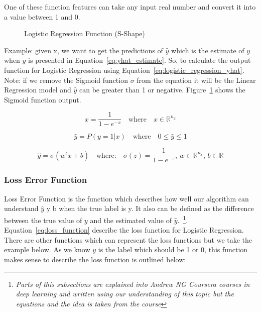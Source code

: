 One of these function features can take any input real number and convert it into a value between 1 and 0.

\begin{figure}
\centering

\caption{Logistic Regression Function (S-Shape)}\label{Fig:Logistic}
\end{figure}

Example: given x, we want to get the predictions of $\widehat{y}$ which is the estimate of $y$ when $\widehat{y}$ is presented in Equation~\eqref{eq:yhat_estimate}. So, to calculate the output function for Logistic Regression using Equation~\eqref{eq:logistic_regression_yhat}. Note: if we remove the Sigmoid function $\sigma$ from the equation it will be the Linear Regression model and $\widehat{y}$ can be greater than 1 or negative. Figure~\ref{Fig:Logistic} shows the Sigmoid function output. 

\begin{equation}\label{eq:logistic_function}
 x = \frac{1}{1-e^{-x}} \quad \text{where} \quad x \in \mathbb{R}^{n_x} 
\end{equation}

\begin{equation}
 \label{eq:yhat_estimate}
  \widehat{y} = P(y=1 | x) \quad \text{where} \quad 0 \le \widehat{y} \le 1
 \end{equation}

\begin{equation}
 \label{eq:logistic_regression_yhat}
 \widehat{y} = \sigma(w^t x + b) \quad \text{where:} \quad \sigma(z) = \frac{1}{1-e^{-z}} \text{, } w \in \mathbb{R}^{n_x} \text{, } b \in \mathbb{R} 
\end{equation}


\subsubsection{Loss Error Function}

Loss Error Function is the function which describes how well our algorithm can understand $\widehat{y}$ y b when the true label is y. It also can be defined as the difference between the true value of $y$ and the estimated value of $\widehat{y}$.~\footnote{\textit{Parts of this subsections are explained into Andrew NG Coursera courses in deep learning and written using our understanding of this topic but the equations and the idea is taken from the course}}. Equation~\eqref{eq:loss_function} describe the loss function for Logistic Regression. There are other functions which can represent the loss functions but we take the example below. As we know $y$ is the label which should be 1 or 0, this function makes sense to describe the loss function is outlined below:

